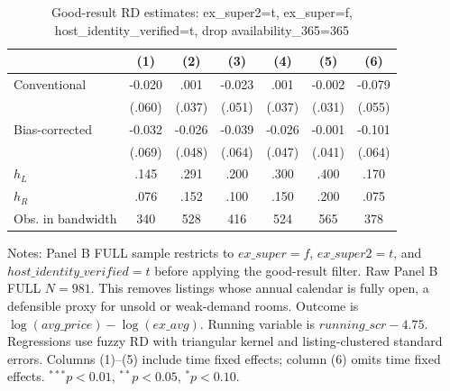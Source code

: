 \begin{table}[!htbp]
\centering
\caption{Good-result RD estimates: ex\_super2=t, ex\_super=f, host\_identity\_verified=t, drop availability\_365=365}
\label{tab:good_result_drop_availability365_365}
\begin{tabular}{lcccccc}
\hline
 & (1) & (2) & (3) & (4) & (5) & (6)
\\
\hline
Conventional & -0.020 & .001 & -0.023 & .001 & -0.002 & -0.079
\\
 & (.060) & (.037) & (.051) & (.037) & (.031) & (.055)
\\
Bias-corrected & -0.032 & -0.026 & -0.039 & -0.026 & -0.001 & -0.101
\\
 & (.069) & (.048) & (.064) & (.047) & (.041) & (.064)
\\
$h_L$ & .145 & .291 & .200 & .300 & .400 & .170
\\
$h_R$ & .076 & .152 & .100 & .150 & .200 & .075
\\
Obs. in bandwidth & 340 & 528 & 416 & 524 & 565 & 378
\\
\hline
\end{tabular}
\begin{flushleft}
\footnotesize Notes: Panel B FULL sample restricts to $ex\_super=f$, $ex\_super2=t$, and $host\_identity\_verified=t$ before applying the good-result filter. Raw Panel B FULL $N=981$. This removes listings whose annual calendar is fully open, a defensible proxy for unsold or weak-demand rooms. Outcome is $\log(avg\_price)-\log(ex\_avg)$. Running variable is $running\_scr-4.75$. Regressions use fuzzy RD with triangular kernel and listing-clustered standard errors. Columns (1)--(5) include time fixed effects; column (6) omits time fixed effects. $^{***}p<0.01$, $^{**}p<0.05$, $^{*}p<0.10$.
\end{flushleft}
\end{table}

